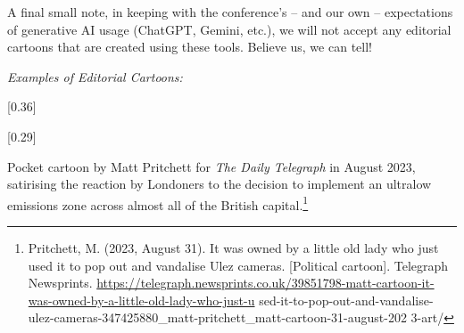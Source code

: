 A final small note, in keeping with the conference’s -- and our own -- expectations of generative AI usage (ChatGPT, Gemini, etc.), we will not accept any editorial cartoons that are created using these tools. Believe us, we can tell!

\emph{Examples of Editorial Cartoons:}

[0.36]

[0.29]

Pocket cartoon by Matt Pritchett for \emph{The Daily Telegraph} in August 2023, satirising the reaction by Londoners to the decision to implement an ultralow emissions zone across almost all of the British capital.\footnote{Pritchett, M. (2023, August 31). It was owned by a little old lady who just used it to pop out and vandalise Ulez cameras. [Political cartoon]. Telegraph Newsprints. \url{https://telegraph.newsprints.co.uk/39851798-matt-cartoon-it-was-owned-by-a-little-old-lady-who-just-u} sed-it-to-pop-out-and-vandalise-ulez-cameras-347425880\_matt-pritchett\_matt-cartoon-31-august-202 3-art/}
